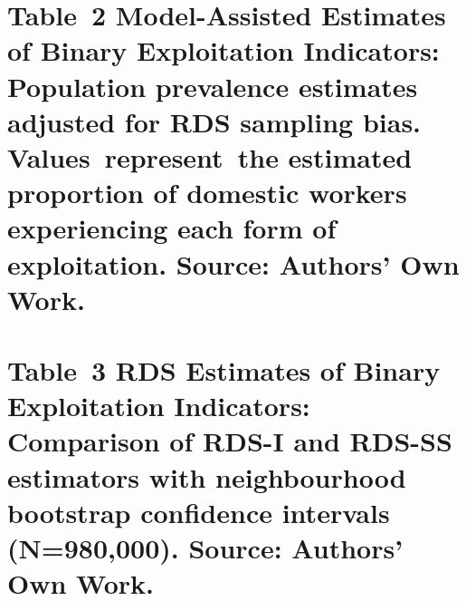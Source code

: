 \documentclass[
  12pt,
  letterpaper,
  DIV=11,
  numbers=noendperiod]{scrartcl}
\begin{document}
\section{Table~2 Model-Assisted Estimates of Binary Exploitation
Indicators: Population prevalence estimates adjusted for RDS sampling
bias. Values~represent~the estimated proportion of domestic workers
experiencing each form of exploitation. Source: Authors' Own
Work.~}\label{table-2-model-assisted-estimates-of-binary-exploitation-indicators-population-prevalence-estimates-adjusted-for-rds-sampling-bias.-values-represent-the-estimated-proportion-of-domestic-workers-experiencing-each-form-of-exploitation.-source-authors-own-work.}

\section{Table~3 RDS Estimates of Binary Exploitation Indicators:
Comparison of RDS-I and RDS-SS estimators with neighbourhood bootstrap
confidence intervals (N=980,000). Source: Authors' Own
Work.}\label{table-3-rds-estimates-of-binary-exploitation-indicators-comparison-of-rds-i-and-rds-ss-estimators-with-neighbourhood-bootstrap-confidence-intervals-n980000.-source-authors-own-work.}


\printbibliography[title=Table~4 NSUM Prevalence Estimates
for~Labour~Exploitation Indicators: Estimates using Modified Basic
Scale-Up (MBSU) method with Sequential Sampling weights and population
size of 980,000 domestic workers. Adjustment factors:
\textbackslash(\textbackslash delta\textbackslash) (δ, degree ratio)
controls for network size differences;
\textbackslash(\textbackslash tau\textbackslash) (τ, visibility/true
positive rate) controls for reporting accuracy and visibility barriers.
Bootstrap confidence intervals based on~neighbourhood~resampling
(B=1000). Source: Authors' Own Work.~]
\end{document}

